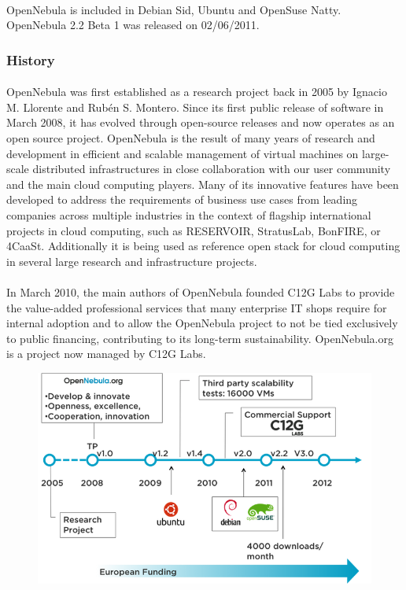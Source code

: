 \paragraph{} OpenNebula is included in Debian Sid, Ubuntu and OpenSuse Natty. OpenNebula 2.2 Beta 1 was released on 02/06/2011.

\subsubsection{History}
\paragraph{}
OpenNebula was first established as a research project back in 2005 by Ignacio M. Llorente and Rubén S. Montero. 
Since its first public release of software in March 2008, it has evolved through open-source releases and now operates as an open source project.
 OpenNebula is the result of many years of research and development in efficient and scalable management of virtual machines on large-scale distributed infrastructures in close collaboration with our user community and the main cloud computing players.
 Many of its innovative features have been developed to address the requirements of business use cases from leading companies across multiple industries in the context of flagship international projects in cloud computing, such as RESERVOIR, StratusLab, BonFIRE, or 4CaaSt.
 Additionally it is being used as reference open stack for cloud computing in several large research and infrastructure projects. \par
\paragraph{}In March 2010, the main authors of OpenNebula founded C12G Labs to provide the value-added professional services that many enterprise IT shops require 
for internal adoption and to allow the OpenNebula project to not be tied exclusively to public financing,
 contributing to its long-term sustainability.
 OpenNebula.org is a project now managed by C12G Labs.\par
\begin{figure}[!h]
 \center
 \includegraphics{./images/platform/OpenNebula/history}
\end{figure}

